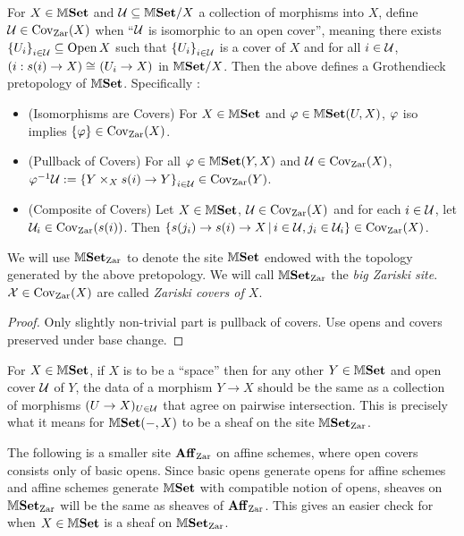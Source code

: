 \documentclass[../main.tex]{subfiles}
\begin{document}
\begin{prop}
  
  For $X \in \mathbb{M}\mathbf{Set}$ and $\mathcal{U} \subseteq \mathbb{M}\mathbf{Set}/X$ 
  a collection of morphisms into $X$,
  define $\mathcal{U} \in \operatorname{Cov}_{\mathrm{Zar}}(X)$ when 
  ``$\mathcal{U}$ is isomorphic to an open cover'',
  meaning there exists $\left\{U_i\right\}_{i\in\mathcal{U}} \subseteq \operatorname{Open} X$ such that 
  $\left\{U_i\right\}_{i\in\mathcal{U}}$ is a cover of $X$ and 
  for all $i \in \mathcal{U}$, $\left(i : s(i) \to X\right) \cong_{} \left(U_i \to X\right)$
  in $\mathbb{M}\mathbf{Set}/X$.
  Then the above defines a Grothendieck pretopology of $\mathbb{M}\mathbf{Set}$.
  Specifically : 
  \begin{itemize}
    \item (Isomorphisms are Covers)
    For $X \in \mathbb{M}\mathbf{Set}$ and $\varphi \in \mathbb{M}\mathbf{Set}(U,X)$,
    $\varphi$ iso implies $\left\{\varphi\right\} \in \operatorname{Cov}_{\mathrm{Zar}}(X)$.
    \item (Pullback of Covers)
    For all $\varphi \in \mathbb{M}\mathbf{Set}(Y,X)$ and $\mathcal{U} \in \operatorname{Cov}_{\mathrm{Zar}}(X)$,\newline
    $\varphi^{-1}\mathcal{U} := \left\{Y\times_X s(i) \to Y\right\}_{i \in \mathcal{U}} 
    \in \operatorname{Cov}_{\mathrm{Zar}}(Y)$.
    \item (Composite of Covers)
    Let $X \in \mathbb{M}\mathbf{Set}$, $\mathcal{U} \in \operatorname{Cov}_{\mathrm{Zar}}(X)$ and for each $i \in \mathcal{U}$,
    let $\mathcal{U}_i \in \operatorname{Cov}_{\mathrm{Zar}}(s(i))$.
    Then $\left\{s(j_i) \to s(i) \to X \,|\, i \in \mathcal{U}, j_i \in \mathcal{U}_i\right\}
    \in \operatorname{Cov}_{\mathrm{Zar}}(X)$.
  \end{itemize}
  We will use $\mathbb{M}\mathbf{Set}_{\mathrm{Zar}}$ to denote the site $\mathbb{M}\mathbf{Set}$ endowed with 
  the topology generated by the above pretopology. 
  We will call $\mathbb{M}\mathbf{Set}_{\mathrm{Zar}}$ the \emph{big Zariski site}.
  $\mathcal{X} \in \operatorname{Cov}_{\mathrm{Zar}}(X)$ are called \emph{Zariski covers of $X$}.
\end{prop}
\begin{proof}
  Only slightly non-trivial part is pullback of covers.
  Use opens and covers preserved under base change.
\end{proof}

\begin{rmk}
  For $X \in \mathbb{M}\mathbf{Set}$,
  if $X$ is to be a ``space'' then 
  for any other $Y \in \mathbb{M}\mathbf{Set}$ and open cover $\mathcal{U}$ of $Y$,
  the data of a morphism $Y \to X$ should be the same as 
  a collection of morphisms $(U \to X)_{U \in \mathcal{U}}$ that
  agree on pairwise intersection. 
  This is precisely what it means for 
  $\mathbb{M}\mathbf{Set}(-,X)$ to be a sheaf on the site $\mathbb{M}\mathbf{Set}_{\mathrm{Zar}}$.
\end{rmk}

\begin{rmk}
  The following is a smaller site $\mathbf{Aff}_{\mathrm{Zar}}$ on affine schemes,
  where open covers consists only of basic opens. 
  Since basic opens generate opens for affine schemes and 
  affine schemes generate $\mathbb{M}\mathbf{Set}$ with compatible notion of opens,
  sheaves on $\mathbb{M}\mathbf{Set}_{\mathrm{Zar}}$ will be the same as sheaves of $\mathbf{Aff}_{\mathrm{Zar}}$.
  This gives an easier check for when $X \in \mathbb{M}\mathbf{Set}$ is a 
  sheaf on $\mathbb{M}\mathbf{Set}_{\mathrm{Zar}}$.
\end{rmk}
\end{document}
